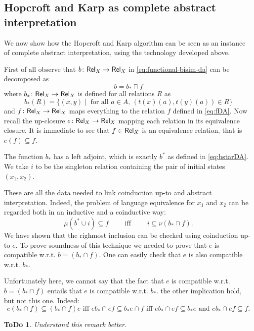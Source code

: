 \documentclass[smallcondensed,envcountsect,envcountsame]{svjour3}     %
\newtheorem{todo}[theorem]{\bf ToDo}
\begin{document}


\subsection{Hopcroft and Karp as complete abstract interpretation}
We now show how the Hopcroft and Karp algorithm can be seen as an instance of complete abstract interpretation, using the technology developed above.

First of all observe that $b\colon \mathsf{Rel}_X\to \mathsf{Rel}_X$ in \eqref{eq:functional-bisim-da} can be decomposed as
$$b = b_* \sqcap f$$
where $b_* \colon \mathsf{Rel}_X\to  \mathsf{Rel}_X$ is defined for all relations $R$ as
\begin{equation}
b_*(R) =\{(x,y) \mid \text{ for all } a\in A, \, (t(x)(a), t(y)(a))\in R  \}
\end{equation}
and $f\colon \mathsf{Rel}_X \to \mathsf{Rel}_X$ maps everything to the relation $f$ defined in \eqref{eq:fDA}.
Now recall the up-closure $e\colon \mathsf{Rel}_X \to \mathsf{Rel}_X$ mapping each relation in its equivalence closure. It is immediate to see that $f\in \mathsf{Rel}_X$ is an equivalence relation, that is $e(f)\subseteq f$.

The function $b_*$ has a left adjoint, which is exactly $b^*$ as defined in \eqref{eq:bstarDA}. We take $i$ to be the singleton relation containing the pair of initial states $(x_1,x_2)$.

These are all the data needed to link coinduction up-to and abstract interpretation.
Indeed, the problem of language equivalence for $x_1$ and $x_2$ can be regarded both in an inductive and a coinductive way:
$$ \mu (b^*\cup i ) \subseteq  f \qquad  \text{ iff }\qquad i \subseteq \nu (b_*\cap f)\text{.}$$ 
We have shown that the righmost inclusion can be checked using coinduction up-to $e$. To prove soundness of this technique we needed to prove that $e$ is compatible w.r.t. $b=(b_*\cap f)$. One can easily check that $e$ is also compatible w.r.t. $b_*$.

\begin{remark}
Unfortunately here, we cannot say that the fact that $e$ is compatible w.r.t. $b=(b_*\cap f)$ entails that $e$ is compatible w.r.t. $b_*$. the other implication hold, but not this one. Indeed: 
$$e(b_*\cap f) \subseteq (b_*\cap f) e \text{ iff } eb_* \cap ef \subseteq b_* e \cap f \text{ iff }  eb_* \cap ef \subseteq b_* e \text{ and }  eb_* \cap ef \subseteq  f\text{.}$$
\end{remark}
\begin{todo}
Understand this remark better.
\end{todo}
\end{document}
